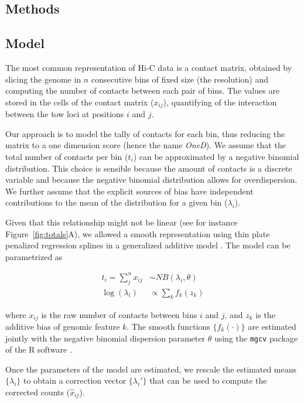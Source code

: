 \documentclass{bioinfo}
\begin{document}
\begin{methods}

\section{Methods}

\subsection{Model}
\label{sec:model}

The most common representation of Hi-C data is a contact matrix, obtained
by slicing the genome in $n$ consecutive bins of fixed size (the
resolution) and computing the number of contacts between each pair of
bins. The values are stored in the cells of the contact matrix ($x_{ij}$),
quantifying of the interaction between the tow loci at positions $i$ and
$j$.

Our approach is to model the tally of contacts for each bin, thus reducing
the matrix to a one dimension score (hence the name \textit{OneD}). We assume that
the total number of contacts per bin ($t_{i}$) can be approximated by a
negative binomial distribution. This choice is sensible because the amount
of contacts is a discrete variable and because the negative binomial
distribution allows for overdispersion. We further assume that the
explicit sources of bias have independent contributions to the mean of the
distribution for a given bin ($\lambda_i$).

Given that this relationship might not be linear (see for instance
Figure~\ref{fig:totals}A), we allowed a smooth representation
using thin plate penalized regression splines \citep{wood2003thin} in a
generalized additive model \citep{wood2011fast}. The model can be
parametrized as

\begin{align*}
t_i = \sum_j^n{x_{ij}} &\sim  NB(\lambda_i, \theta) \\
\log(\lambda_i) &\propto \sum_{k}{f_k(z_k)}
\end{align*}

\noindent
where $x_{ij}$ is the raw number of contacts between bins $i$ and $j$, and
$z_k$ is the additive bias of genomic feature $k$. The smooth functions
$\{f_k(\cdot)\}$ are estimated jointly with the negative binomial
dispersion parameter $\theta$ using the \texttt{mgcv} package
\citep{wood2011fast} of the R software \citep{coreteam2014r}.

Once the parameters of the model are estimated, we rescale the estimated
means $\{\lambda_i\}$ to obtain a correction vector $\{\lambda_i'\}$ that
can be used to compute the corrected counts ($\hat{x}_{ij}$).


\end{methods}
\end{document}
